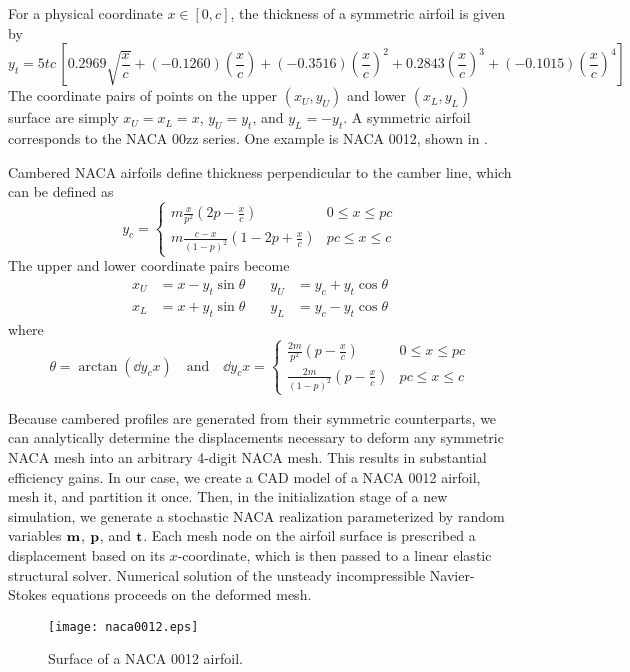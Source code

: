 \documentclass[11pt]{article}
\begin{document}
For a physical coordinate $x \in [0, c]$, the thickness of a symmetric airfoil is given by
\begin{equation}
y_t = 5tc\, \left[ 0.2969 \sqrt{\frac{x}{c}} + (-0.1260) \left(\frac{x}{c}\right) + (-0.3516) \left(\frac{x}{c}\right)^2 + 0.2843 \left(\frac{x}{c}\right)^3 + (-0.1015) \left( \frac{x}{c} \right)^4 \right]
\end{equation}
The coordinate pairs of points on the upper $(x_U, y_U)$ and lower $(x_L, y_L)$ surface are simply $x_U = x_L = x$, $y_U = y_t$, and $y_L = -y_t$. A symmetric airfoil corresponds to the NACA 00zz series. One example is NACA 0012, shown in .

Cambered NACA airfoils define thickness perpendicular to the camber line, which can be defined as
\begin{equation}
y_c = \begin{cases}
m \frac{x}{p^2} \left( 2p-\frac{x}{c}\right) & 0 \le x \le pc \\
m \frac{c-x}{(1-p)^2} \left(1-2p+\frac{x}{c}\right) & pc \le x \le c
\end{cases}
\end{equation}
The upper and lower coordinate pairs become
\begin{equation}
\begin{aligned}
x_U &= x - y_t \sin \theta &\quad y_U &= y_c + y_t \cos \theta \\
x_L &= x + y_t \sin \theta &\quad y_L &= y_c - y_t \cos \theta
\end{aligned}
\end{equation}
where
\begin{equation}
\theta = \arctan \left( \dd{y_c}{x} \right)
\quad \text{and} \quad
\dd{y_c}{x} =
\begin{cases}
\frac{2m}{p^2} \left( p - \frac{x}{c} \right) & 0 \le x \le pc \\
\frac{2m}{(1-p)^2} \left( p - \frac{x}{c} \right) & pc \le x \le c
\end{cases}
\end{equation}

Because cambered profiles are generated from their symmetric counterparts, we can analytically determine the displacements necessary to deform any symmetric NACA mesh into an arbitrary 4-digit NACA mesh. This results in substantial efficiency gains. In our case, we create a CAD model of a NACA 0012 airfoil, mesh it, and partition it once. Then, in the initialization stage of a new simulation, we generate a stochastic NACA realization parameterized by random variables $\mb{m}$, $\mb{p}$, and $\mb{t}$. Each mesh node on the airfoil surface is prescribed a displacement based on its $x$-coordinate, which is then passed to a linear elastic structural solver. Numerical solution of the unsteady incompressible Navier-Stokes equations proceeds on the deformed mesh.

\begin{figure}[b]
\begin{center}
\texttt{[image: naca0012.eps]}
\vspace{1ex}
\caption{Surface of a NACA 0012 airfoil.}
\label{fig:naca0012}
\end{center}
\end{figure}




\label{lastpage}
\end{document}
